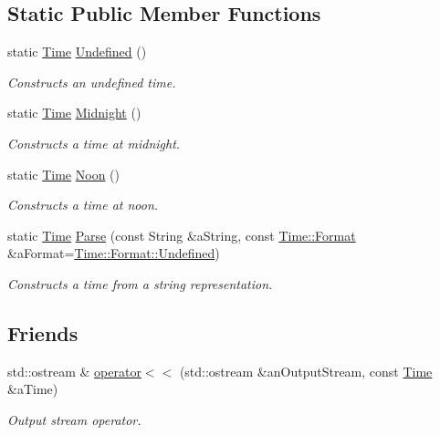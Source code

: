 \subsection*{Static Public Member Functions}
\begin{DoxyCompactItemize}
\item 
static \hyperlink{classostk_1_1physics_1_1time_1_1_time}{Time} \hyperlink{classostk_1_1physics_1_1time_1_1_time_a17c9ae2f4fa9c8a48a558fa49c511e03}{Undefined} ()
\begin{DoxyCompactList}\small\item\em Constructs an undefined time. \end{DoxyCompactList}\item 
static \hyperlink{classostk_1_1physics_1_1time_1_1_time}{Time} \hyperlink{classostk_1_1physics_1_1time_1_1_time_a74042a99c99ef0f866204a4589c6a89e}{Midnight} ()
\begin{DoxyCompactList}\small\item\em Constructs a time at midnight. \end{DoxyCompactList}\item 
static \hyperlink{classostk_1_1physics_1_1time_1_1_time}{Time} \hyperlink{classostk_1_1physics_1_1time_1_1_time_a2d242e4f07bbf56e51eb2267773042f2}{Noon} ()
\begin{DoxyCompactList}\small\item\em Constructs a time at noon. \end{DoxyCompactList}\item 
static \hyperlink{classostk_1_1physics_1_1time_1_1_time}{Time} \hyperlink{classostk_1_1physics_1_1time_1_1_time_a475b2b6200f15f20c8fab3891bbb73ac}{Parse} (const String \&a\+String, const \hyperlink{classostk_1_1physics_1_1time_1_1_time_a207e776746c45c3aaffcf7112b2bc951}{Time\+::\+Format} \&a\+Format=\hyperlink{classostk_1_1physics_1_1time_1_1_time_a207e776746c45c3aaffcf7112b2bc951aec0fc0100c4fc1ce4eea230c3dc10360}{Time\+::\+Format\+::\+Undefined})
\begin{DoxyCompactList}\small\item\em Constructs a time from a string representation. \end{DoxyCompactList}\end{DoxyCompactItemize}
\subsection*{Friends}
\begin{DoxyCompactItemize}
\item 
std\+::ostream \& \hyperlink{classostk_1_1physics_1_1time_1_1_time_a181948621d8fe0d85bdfc97af30b62fb}{operator$<$$<$} (std\+::ostream \&an\+Output\+Stream, const \hyperlink{classostk_1_1physics_1_1time_1_1_time}{Time} \&a\+Time)
\begin{DoxyCompactList}\small\item\em Output stream operator. \end{DoxyCompactList}\end{DoxyCompactItemize}


